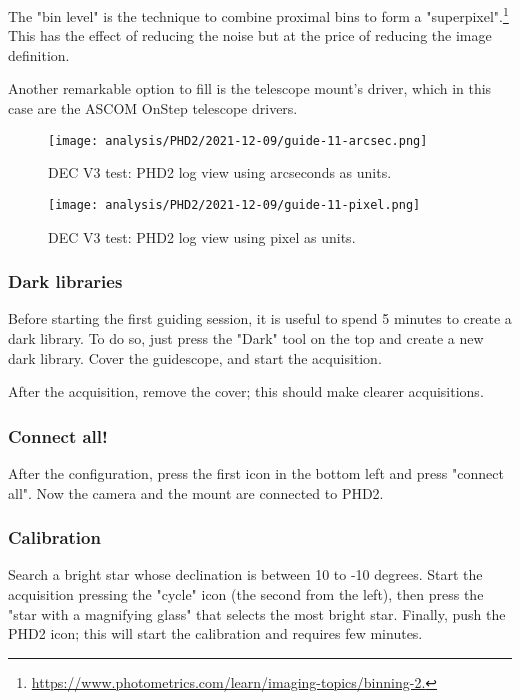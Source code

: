 The "bin level" is the technique to combine proximal bins to form a "superpixel".\footnote{\url{https://www.photometrics.com/learn/imaging-topics/binning-2.}}
This has the effect of reducing the noise but at the price of reducing the image definition.

Another remarkable option to fill is the telescope mount's driver, which in this case are the ASCOM OnStep telescope drivers.

\begin{figure*}[t]
    \centering
    \texttt{[image: analysis/PHD2/2021-12-09/guide-11-arcsec.png]}
    \caption{DEC V3 test: PHD2 log view using arcseconds as units.}
    \label{fig:guide-11-arcsec}
\end{figure*}
\begin{figure*}[t]
    \centering
    \texttt{[image: analysis/PHD2/2021-12-09/guide-11-pixel.png]}
    \caption{DEC V3 test: PHD2 log view using pixel as units.}
    \label{fig:guide-11-pixel}
\end{figure*}

\subsubsection{Dark libraries}
Before starting the first guiding session, it is useful to spend 5 minutes to create a dark library.
To do so, just press the "Dark" tool on the top and create a new dark library.
Cover the guidescope, and start the acquisition.

After the acquisition, remove the cover;
this should make clearer acquisitions.

\subsubsection{Connect all!}
After the configuration, press the first icon in the bottom left and press "connect all".
Now the camera and the mount are connected to PHD2.

\subsubsection{Calibration}
Search a bright star whose declination is between 10 to -10 degrees.
Start the acquisition pressing the "cycle" icon (the second from the left), then press the "star with a magnifying glass" that selects the most bright star.
Finally, push the PHD2 icon; this will start the calibration and requires few minutes.

